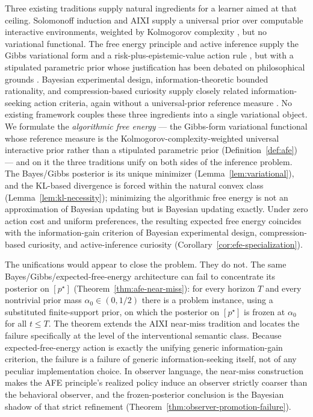 \documentclass[11pt]{article}
\theoremstyle{definition}
\theoremstyle{remark}
\begin{document}
Three existing traditions supply natural ingredients for a learner aimed at that ceiling. Solomonoff induction and AIXI supply a universal prior over computable interactive environments, weighted by Kolmogorov complexity \citep{Solomonoff1964a,Solomonoff1964b,Kolmogorov1965,Hutter2005}, but no variational functional. The free energy principle and active inference supply the Gibbs variational form and a risk-plus-epistemic-value action rule \citep{Friston2010,FristonEtAl2017Curiosity,ParrFriston2019}, but with a stipulated parametric prior whose justification has been debated on philosophical grounds \citep{ColombWright2021}. Bayesian experimental design, information-theoretic bounded rationality, and compression-based curiosity supply closely related information-seeking action criteria, again without a universal-prior reference measure \citep{Lindley1956,ChalonerVerdinelli1995,MacKay1992,OrtegaBraun2013,Schmidhuber1991,Schmidhuber2010}. No existing framework couples these three ingredients into a single variational object. We formulate the \emph{algorithmic free energy} --- the Gibbs-form variational functional whose reference measure is the Kolmogorov-complexity-weighted universal interactive prior rather than a stipulated parametric prior (Definition~\ref{def:afe}) --- and on it the three traditions unify on both sides of the inference problem. The Bayes/Gibbs posterior is its unique minimizer (Lemma~\ref{lem:variational}), and the KL-based divergence is forced within the natural convex class (Lemma~\ref{lem:kl-necessity}); minimizing the algorithmic free energy is not an approximation of Bayesian updating but is Bayesian updating exactly. Under zero action cost and uniform preferences, the resulting expected free energy coincides with the information-gain criterion of Bayesian experimental design, compression-based curiosity, and active-inference curiosity (Corollary~\ref{cor:efe-specialization}).

The unifications would appear to close the problem. They do not. The same Bayes/Gibbs/expected-free-energy architecture can fail to concentrate its posterior on $[p^\star]$ (Theorem~\ref{thm:afe-near-miss}): for every horizon $T$ and every nontrivial prior mass $\alpha_0\in(0,1/2)$ there is a problem instance, using a substituted finite-support prior, on which the posterior on $[p^\star]$ is frozen at $\alpha_0$ for all $t\le T$. The theorem extends the AIXI near-miss tradition \citep{LeikeHutter2015,Leike2016,LeikeEtAl2016} and locates the failure specifically at the level of the interventional semantic class. Because expected-free-energy action is exactly the unifying generic information-gain criterion, the failure is a failure of generic information-seeking itself, not of any peculiar implementation choice. In observer language, the near-miss construction makes the AFE principle's realized policy induce an observer strictly coarser than the behavioral observer, and the frozen-posterior conclusion is the Bayesian shadow of that strict refinement (Theorem~\ref{thm:observer-promotion-failure}).
\end{document}
